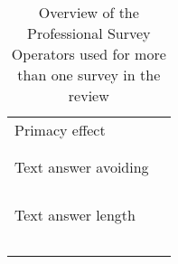 \begin{table}
\begin{tabular}{ll}
        Primacy effect & \cite{erens_comparing_2019, wells_comparison_2014}\\
    	& \cite{mavletova_data_2013, lugtig_use_2016}\\
    	& \cite{tourangeau_web_2017, toepoel_what_2014}\\
        Text answer avoiding & \cite{erens_comparing_2019, wells_comparison_2014}\\
    	& \cite{ha_data_2020, antoun_effects_2017}\\
    	& \cite{de_bruijne_improving_2014, schlosser_mobile_2018}\\
    	& \cite{revilla_open_2016, struminskaya_effects_2015}\\
    	& \cite{toepoel_what_2014}\\
        Text answer length & \cite{wells_comparison_2014, mavletova_data_2013}\\
    	& \cite{antoun_effects_2017, lambert_living_2015}\\
    	& \cite{buskirk_making_2014, schlosser_mobile_2018}\\
    	& \cite{zou_mobile_2021, revilla_open_2016}\\
    	& \cite{toepoel_probing_2021, struminskaya_effects_2015}\\
    	& \cite{lugtig_use_2016, toepoel_what_2014}\\
    		\end{tabular}
	\caption{Overview of the Professional Survey Operators used for more than one survey in the review}
	\label{tab: quality_part_1}
\end{table}

